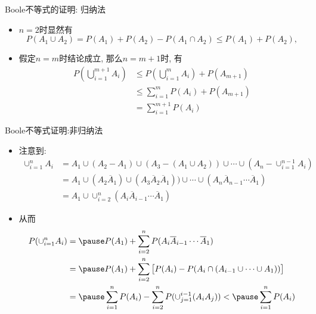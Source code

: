 \begin{frame}{{\rm Boole}不等式的证明: 归纳法}
 \begin{itemize}[<+-|alert@+>]
	\item $n=2$时显然有
	\[
	P\left(A_{1} \cup A_{2}\right)=P\left(A_{1}\right)+P\left(A_{2}\right)-P\left(A_{1} \cap A_{2}\right) \leqslant P\left(A_{1}\right)+P\left(A_{2}\right),
	\]
	\item 假定$n=m$时结论成立, 那么$n=m+1$时, 有
	\begin{align*}
	P(\bigcup_{i=1}^{m+1} A_{i})  &\leq P(\bigcup_{i=1}^{m} A_{i})+P(A_{m+1}) \\
	&\leqslant \sum_{i=1}^{m} P(A_{i})+P(A_{m+1}) \\
	& =\sum_{i=1}^{m+1} P(A_{i})
	\end{align*}


 \end{itemize}



\end{frame}

\begin{frame}{{\rm Boole}不等式证明:非归纳法}
	\begin{itemize}[<+-|alert@+>]
		\item 注意到:
		\begin{align*}
		  \cup_{i=1}^nA_i&=A_1\cup (A_2-A_1)\cup(A_3-(A_1\cup A_2))\cup\cdots\cup(A_n-\cup_{i=1}^{n-1} A_i) \\
		   &=A_1\cup (A_2\overline{A}_1)\cup(A_3\overline{A}_2\overline{A}_1))\cup\cdots\cup(A_n\overline{A}_{n-1}\cdots\overline{A}_1)\\
		   &=A_1\cup \cup_{i=2}^n (A_i\overline{A}_{i-1}\cdots\overline{A}_1)
		\end{align*}
		\item 从而
		\begin{align*}
		  P(\cup_{i=1}^nA_i) &=\pause P(A_1)+\sum_{i=2}^nP(A_i\overline{A}_{i-1}\cdots\overline{A}_1) \\
		   & =\pause P(A_1)+\sum_{i=2}^n\big[P(A_i)-P(A_i\cap (A_{i-1}\cup \cdots \cup A_1))\big] \\
		   &=\pause \sum_{i=1}^nP(A_i)-\sum_{i=2}^nP(\cup_{j=1}^{i-1}(A_iA_j))<\pause \sum_{i=1}^nP(A_i)
		\end{align*}
	\end{itemize}

	\end{frame}


